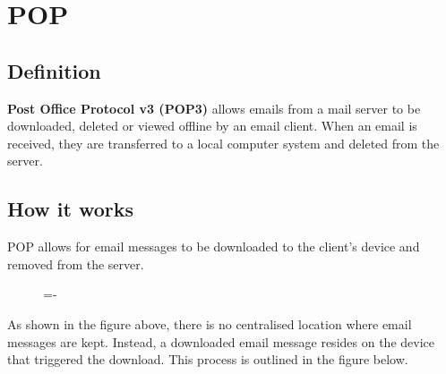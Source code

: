 \documentclass[a4paper]{systems-software}
\begin{document}
\section*{POP}

\subsection*{Definition}

\textbf{Post Office Protocol v3 (POP3)} allows emails from a mail server to be downloaded, deleted or viewed offline by an email client. When an email is received, they are transferred to a local computer system and deleted from the server.


\subsection*{How it works}

POP allows for email messages to be downloaded to the client's device and removed from the server.

\begin{figure}[H]
	\lineskip=-\fboxrule
\end{figure}

As shown in the figure above, there is no centralised location where email messages are kept. Instead, a downloaded email message resides on the device that triggered the download. This process is outlined in the figure below.
\end{document}
